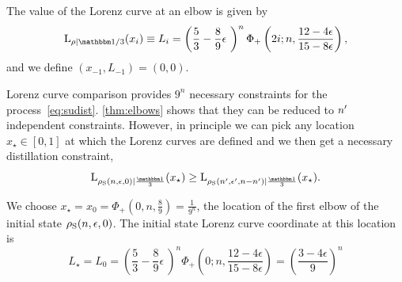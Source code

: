 \documentclass[pra,
aps,
twocolumn,
superscriptaddress,
groupedaddress,
nofootinbib,
reprint
]{revtex4-1}
\begin{document}
The value of the Lorenz curve at an elbow is given by
\begin{equation}
	\lc{\rho}{\id/3}(x_{\ii}) \equiv L_{\ii} =  \left( \frac{5}{3} - \frac{8}{9}\epsilon\ \right)^{n} \Phi_+\left(2i;n,\frac{12-4\epsilon}{15-8\epsilon}\right),
\end{equation}
and we define $(x_{-1}, L_{-1}) = (0,0)$.

Lorenz curve comparison provides $9^n$ necessary constraints for the process~\cref{eq:sudist}.
\cref{thm:elbows} shows that they can be reduced to $\tt$ independent constraints.
However, in principle we can pick any location $x_\star \in [0,1]$ at which the Lorenz curves are defined and we then get a necessary distillation constraint, 
\begin{equation}
	\lc{\noisys(n, \epsilon, 0)}{\frac{\id}{3}}(x_\star) \geq \lc{\noisys(\tt, \epsilon', n-\tt)}{\frac{\id}{3}}(x_\star).
\end{equation}

We choose $x_\star = x_0 = \Phi_+(0, n, \frac{8}{9}) = \frac{1}{9^{n}}$, the location of the first elbow of the initial state $\noisys(n, \epsilon, 0)$.
The initial state Lorenz curve coordinate at this location is
\begin{equation}
	L_\star = L_0 = \left( \frac{5}{3} - \frac{8}{9}\epsilon\ \right)^{n} \Phi_+\left(0;n,\frac{12-4\epsilon}{15-8\epsilon}\right) = \left(\frac{3-4\epsilon}{9}\right)^n
\end{equation}
\end{document}
